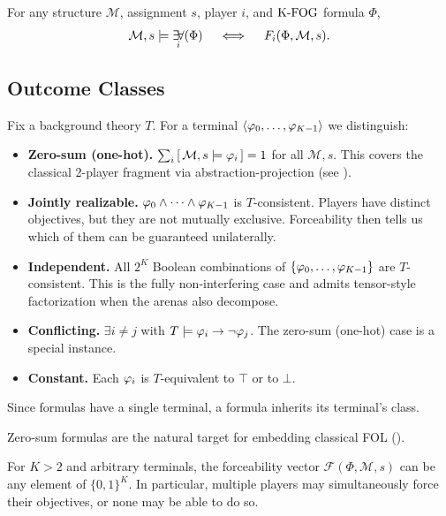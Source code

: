 \begin{lemma}
For any structure $\mathcal M$, assignment $s$, player $i$, and
$\mathrm{K\text{-}FOG}$ formula $\Phi$,
\[
\mathcal M,s \models \mathop{\exists\!\forall}_{i}\!\left(\Phi\right)
\quad\iff\quad
F_i(\Phi,\mathcal M,s).
\]
\end{lemma}

\subsection{Outcome Classes}
\label{sec:outcome-classes}

Fix a background theory $T$.
For a terminal $\langle \varphi_0,\ldots,\varphi_{K-1} \rangle$ we distinguish:

\begin{itemize}
  \item \textbf{Zero-sum (one-hot).}
    $\sum_i \left[\,\mathcal M,s \models \varphi_i\,\right] = 1$ for all $\mathcal M,s$.
    This covers the classical 2-player fragment via abstraction-projection
    (see ).

  \item \textbf{Jointly realizable.}
    $\varphi_0 \wedge \cdots \wedge \varphi_{K-1}$ is $T$-consistent.
    Players have distinct objectives, but they are not mutually exclusive.
    Forceability then tells us which of them can be guaranteed unilaterally.

  \item \textbf{Independent.}
    All $2^K$ Boolean combinations of $\{\varphi_0,\ldots,\varphi_{K-1}\}$ are
    $T$-consistent.
    This is the fully non-interfering case and admits tensor-style
    factorization when the arenas also decompose.

  \item \textbf{Conflicting.}
    $\exists i \neq j$ with $T \models \varphi_i \rightarrow \neg \varphi_j$.
    The zero-sum (one-hot) case is a special instance.

  \item \textbf{Constant.}
    Each $\varphi_i$ is $T$-equivalent to $\top$ or to $\bot$.
\end{itemize}

Since \KFOL formulas have a single terminal, a formula inherits its terminal's class.

\begin{remark}
Zero-sum formulas are the natural target for embedding classical FOL ().
\end{remark}

\begin{remark}
\label{rem:no-determinacy}
For $K > 2$ and arbitrary terminals, the forceability vector $\mathcal{F}(\Phi,\mathcal{M},s)$ can be any element of $\{0,1\}^K$. 
In particular, multiple players may simultaneously force their objectives, or none may be able to do so.
\end{remark}

